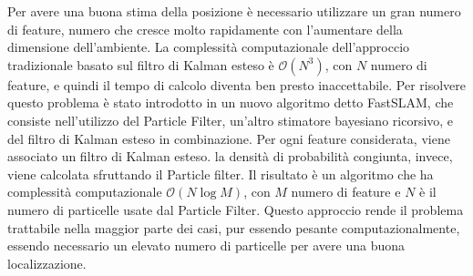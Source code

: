 Per avere una buona stima della posizione è necessario utilizzare un gran numero di feature, numero che cresce molto rapidamente con l'aumentare della dimensione dell'ambiente.
La complessità computazionale dell'approccio tradizionale basato sul filtro di Kalman esteso è $\mathcal{O}(N^3)$, con $N$ numero di feature, e quindi il tempo di calcolo diventa ben presto inaccettabile.
Per risolvere questo problema è stato introdotto in \cite{Montemerlo02a}  un nuovo algoritmo detto FastSLAM, che consiste nell'utilizzo del Particle Filter, un'altro stimatore bayesiano ricorsivo, e del filtro di Kalman esteso in combinazione.
Per ogni feature considerata, viene associato un filtro di Kalman esteso. 
la densità di probabilità congiunta, invece, viene calcolata sfruttando il Particle filter. 
Il risultato è un algoritmo che ha complessità computazionale $\mathcal{O}(N\log M)$, con $M$ numero di feature e $N$ è il numero di particelle usate dal Particle Filter. 
Questo approccio rende il problema trattabile nella maggior parte dei casi, pur essendo pesante computazionalmente, essendo necessario un elevato numero di particelle per avere una buona localizzazione.



